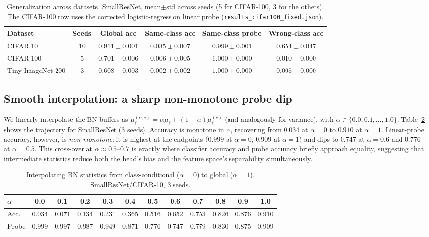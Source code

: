 \documentclass[11pt]{article}
\begin{document}
\begin{table}[t]
\centering
\caption{Generalization across datasets. SmallResNet, mean$\pm$std across seeds (5 for CIFAR-100, 3 for the others). The CIFAR-100 row uses the corrected logistic-regression linear probe (\texttt{results\_cifar100\_fixed.json}).}
\label{tab:datasets}
\small
\begin{tabular}{lccccc}
\toprule
Dataset & Seeds & Global acc & Same-class acc & Same-class probe & Wrong-class acc \\
\midrule
CIFAR-10               & 10 & $0.911 \pm 0.001$ & $0.035 \pm 0.007$ & $0.999 \pm 0.001$ & $0.654 \pm 0.047$ \\
CIFAR-100              & 5  & $0.701 \pm 0.006$ & $0.006 \pm 0.005$ & $1.000 \pm 0.000$ & $0.010 \pm 0.000$ \\
Tiny-ImageNet-200      & 3  & $0.608 \pm 0.003$ & $0.002 \pm 0.002$ & $1.000 \pm 0.000$ & $0.005 \pm 0.000$ \\
\bottomrule
\end{tabular}
\end{table}

\subsection{Smooth interpolation: a sharp non-monotone probe dip}
We linearly interpolate the BN buffers as $\mu^{(\alpha,c)}_\ell = \alpha \mu_\ell + (1-\alpha) \mu_\ell^{(c)}$ (and analogously for variance), with $\alpha \in \{0.0, 0.1, \ldots, 1.0\}$. Table~\ref{tab:interp} shows the trajectory for SmallResNet (3 seeds). Accuracy is monotone in $\alpha$, recovering from $0.034$ at $\alpha=0$ to $0.910$ at $\alpha=1$. Linear-probe accuracy, however, is \emph{non-monotone}: it is highest at the endpoints ($0.999$ at $\alpha=0$, $0.909$ at $\alpha=1$) and dips to $0.747$ at $\alpha=0.6$ and $0.776$ at $\alpha=0.5$. This cross-over at $\alpha\approx 0.5\text{--}0.7$ is exactly where classifier accuracy and probe accuracy briefly approach equality, suggesting that intermediate statistics reduce both the head's bias and the feature space's separability simultaneously.

\begin{table}[t]
\centering
\caption{Interpolating BN statistics from class-conditional ($\alpha=0$) to global ($\alpha=1$). SmallResNet/CIFAR-10, 3 seeds.}
\label{tab:interp}
\small
\begin{tabular}{lccccccccccc}
\toprule
$\alpha$    & 0.0 & 0.1 & 0.2 & 0.3 & 0.4 & 0.5 & 0.6 & 0.7 & 0.8 & 0.9 & 1.0 \\
\midrule
Acc.        & 0.034 & 0.071 & 0.134 & 0.231 & 0.365 & 0.516 & 0.652 & 0.753 & 0.826 & 0.876 & 0.910 \\
Probe       & 0.999 & 0.997 & 0.987 & 0.949 & 0.871 & 0.776 & 0.747 & 0.779 & 0.830 & 0.875 & 0.909 \\
\bottomrule
\end{tabular}
\end{table}
\end{document}
